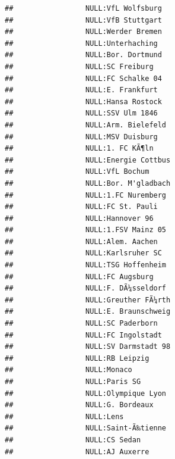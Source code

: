 \documentclass{article}\usepackage[]{graphicx}\usepackage[]{color}
\makeatletter
\newenvironment{kframe}{%
 \def\at@end@of@kframe{}%
 \ifinner\ifhmode%
  \def\at@end@of@kframe{\end{minipage}}%
  \begin{minipage}{\columnwidth}%
 \fi\fi%
 \def\FrameCommand##1{\hskip\@totalleftmargin \hskip-\fboxsep
 \colorbox{shadecolor}{##1}\hskip-\fboxsep
     \hskip-\linewidth \hskip-\@totalleftmargin \hskip\columnwidth}%
 \MakeFramed {\advance\hsize-\width
   \@totalleftmargin\z@ \linewidth\hsize
   \@setminipage}}%
 {\par\unskip\endMakeFramed%
 \at@end@of@kframe}
\newenvironment{knitrout}{}{} %
\makeatother
\begin{document}
\begin{knitrout}
\begin{kframe}
\begin{verbatim}
##                 NULL:VfL Wolfsburg                             
##                 NULL:VfB Stuttgart                             
##                 NULL:Werder Bremen                             
##                 NULL:Unterhaching                              
##                 NULL:Bor. Dortmund                             
##                 NULL:SC Freiburg                               
##                 NULL:FC Schalke 04                             
##                 NULL:E. Frankfurt                              
##                 NULL:Hansa Rostock                             
##                 NULL:SSV Ulm 1846                              
##                 NULL:Arm. Bielefeld                            
##                 NULL:MSV Duisburg                              
##                 NULL:1. FC KÃ¶ln                               
##                 NULL:Energie Cottbus                           
##                 NULL:VfL Bochum                                
##                 NULL:Bor. M'gladbach                           
##                 NULL:1.FC Nuremberg                            
##                 NULL:FC St. Pauli                              
##                 NULL:Hannover 96                               
##                 NULL:1.FSV Mainz 05                            
##                 NULL:Alem. Aachen                              
##                 NULL:Karlsruher SC                             
##                 NULL:TSG Hoffenheim                            
##                 NULL:FC Augsburg                               
##                 NULL:F. DÃ¼sseldorf                            
##                 NULL:Greuther FÃ¼rth                           
##                 NULL:E. Braunschweig                           
##                 NULL:SC Paderborn                              
##                 NULL:FC Ingolstadt                             
##                 NULL:SV Darmstadt 98                           
##                 NULL:RB Leipzig                                
##                 NULL:Monaco                                    
##                 NULL:Paris SG                                  
##                 NULL:Olympique Lyon                            
##                 NULL:G. Bordeaux                               
##                 NULL:Lens                                      
##                 NULL:Saint-Ã‰tienne                            
##                 NULL:CS Sedan                                  
##                 NULL:AJ Auxerre                                

\end{verbatim}
\end{kframe}
\end{knitrout}
\end{document}
